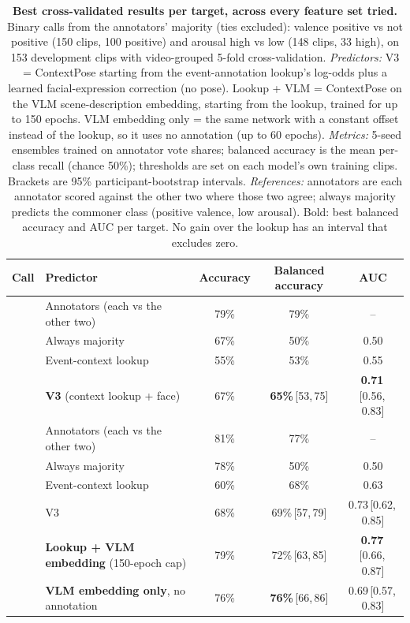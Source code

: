\documentclass[11pt]{article}
\newcommand{\best}[1]{\textbf{#1}}
\newcommand{\ci}[2]{\,[#1,\,#2]}
\begin{document}
\begin{table}[!htbp]
\centering
\caption{\textbf{Best cross-validated results per target, across every feature set tried.}
Binary calls from the annotators' majority (ties excluded): valence positive vs not positive (150 clips, 100 positive) and arousal high vs low (148 clips, 33 high), on 153 development clips with video-grouped 5-fold cross-validation.
\emph{Predictors:} V3 = ContextPose starting from the event-annotation lookup's log-odds plus a learned facial-expression correction (no pose). Lookup + VLM = ContextPose on the VLM scene-description embedding, starting from the lookup, trained for up to 150 epochs. VLM embedding only = the same network with a constant offset instead of the lookup, so it uses no annotation (up to 60 epochs).
\emph{Metrics:} 5-seed ensembles trained on annotator vote shares; balanced accuracy is the mean per-class recall (chance 50\%); thresholds are set on each model's own training clips. Brackets are 95\% participant-bootstrap intervals.
\emph{References:} annotators are each annotator scored against the other two where those two agree; always majority predicts the commoner class (positive valence, low arousal). Bold: best balanced accuracy and AUC per target. No gain over the lookup has an interval that excludes zero.}
\label{tab:headline}
\begin{tabular}{llccc}
\toprule
Call & Predictor & Accuracy & Balanced accuracy & AUC \\
\midrule
{}
 & Annotators (each vs the other two) & 79\% & 79\% & -- \\
 & Always majority & 67\% & 50\% & 0.50 \\
 & Event-context lookup & 55\% & 53\% & 0.55 \\
 & \best{V3} (context lookup + face) & 67\% & \best{65\%}\ci{53}{75} & \best{0.71}\ci{0.56}{0.83} \\
\midrule
{}
 & Annotators (each vs the other two) & 81\% & 77\% & -- \\
 & Always majority & 78\% & 50\% & 0.50 \\
 & Event-context lookup & 60\% & 68\% & 0.63 \\
 & V3 & 68\% & 69\%\ci{57}{79} & 0.73\ci{0.62}{0.85} \\
 & \best{Lookup + VLM embedding} (150-epoch cap) & 79\% & 72\%\ci{63}{85} & \best{0.77}\ci{0.66}{0.87} \\
 & \best{VLM embedding only}, no annotation & 76\% & \best{76\%}\ci{66}{86} & 0.69\ci{0.57}{0.83} \\
\bottomrule
\end{tabular}
\end{table}
\end{document}
